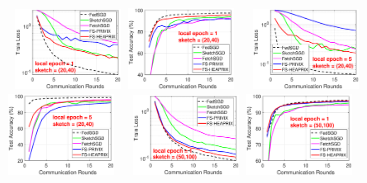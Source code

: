 \documentclass[sigconf, anonymous, review]{acmart}
\begin{document}
\begin{figure}[t]
	\begin{center}
		\mbox{\hspace{-0.25in}			  
		 \includegraphics[width=0.25\textwidth]{MNIST_figures/local1_sketch20_iid1_train_loss.eps} \hspace{-0.12in}
		 \includegraphics[width=0.25\textwidth]{MNIST_figures/local1_sketch20_iid1_test_acc.eps} 
		 }
		 		\mbox{\hspace{-0.25in}		
		\includegraphics[width=0.25\textwidth]{MNIST_figures/local5_sketch20_iid1_train_loss.eps}\hspace{-0.12in}
		\includegraphics[width=0.25\textwidth]{MNIST_figures/local5_sketch20_iid1_test_acc.eps}
		}
		\mbox{\hspace{-0.25in}	
		\includegraphics[width=0.25\textwidth]{MNIST_figures/local1_sketch50_iid1_train_loss.eps} \hspace{-0.12in}
		\includegraphics[width=0.25\textwidth]{MNIST_figures/local1_sketch50_iid1_test_acc.eps} 
}
\end{center}
\end{figure}
\end{document}
